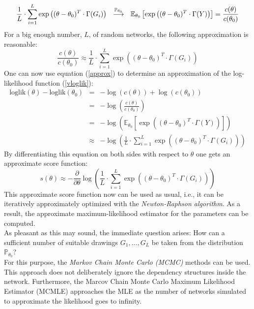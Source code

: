 \documentclass[headsepline=true, abstracton]{scrartcl}
\begin{document}
%
\begin{equation}
\frac{1}{L}\cdot \sum_{i=1}^{L}  \exp\left((\theta - \theta_0)^T \cdot \Gamma(G_i)\right)
~~\stackrel {{\tiny\mathbb{P}_{\theta_0}}}{\longrightarrow}~~ \mathbb{E}_{\theta_0}\left[ \exp\left((\theta - \theta_0)^T \cdot \Gamma(Y)\right) \right] = \frac{c(\theta)}{c(\theta_0)}
\label{konver}
\end{equation}
%
For a big enough number, $L$, of random networks, the following approximation is reasonable:
%
\begin{equation}
\frac{c(\theta)}{c(\theta_0)} \approx \frac{1}{L}\cdot \sum_{i=1}^{L}  \exp\left((\theta - \theta_0)^T \cdot \Gamma(G_i)\right)
\label{approx}
\end{equation}
%
One can now use equation (\ref{approx}) to determine an approximation of the log-likelihood function (\ref{vloglik}):
%
\begin{eqnarray*}
\text{loglik}(\theta)-\text{loglik}(\theta_0)&=&- \log(c(\theta))+\log(c(\theta_0))\\
                                             &=&- \log \left( \frac{c(\theta)}{c(\theta_0)} \right)\\
                                             &=&- \log \left( \mathbb{E}_{\theta_0}\left[ \exp\left((\theta - \theta_0)^T \cdot \Gamma(Y)\right) \right] \right)\\
                                             &\approx &- \log \left( \frac{1}{L} \cdot \sum_{i=1}^{L}  \exp \left((\theta - \theta_0)^T \cdot \Gamma(G_i) \right) \right)
\end{eqnarray*}
%
By differentiating this equation on both sides with respect to $\theta$ one gets an approximate score function:
%
\begin{equation}
s(\theta) \approx -\frac{\partial}{\partial \theta} \log \left( \frac{1}{L} \cdot \sum_{i=1}^{L}  \exp \left((\theta - \theta_0)^T \cdot \Gamma(G_i) \right) \right)
\label{score}
\end{equation}
%
This approximate score function now can be used as usual, i.e., it can be iteratively approximately optimized with the \textit{Newton-Raphson algorithm}. As a result, the approximate maximum-likelihood estimator for the parameters can be computed.\\[0.4cm]
As pleasant as this may sound, the immediate question arises: How can a sufficient number of suitable drawings $G_1,...,G_L$ be taken from the distribution $\mathbb{P}_{\theta_0}$? \\
For this purpose, the \textit{Markov Chain Monte Carlo (MCMC)} methods can be used. This approach does not deliberately ignore the dependency structures inside the network. Furthermore, the Marcov Chain Monte Carlo Maximum Likelihood Estimator (MCMLE) approaches the MLE as the number of networks simulated to approximate the likelihood goes to infinity.
\end{document}
